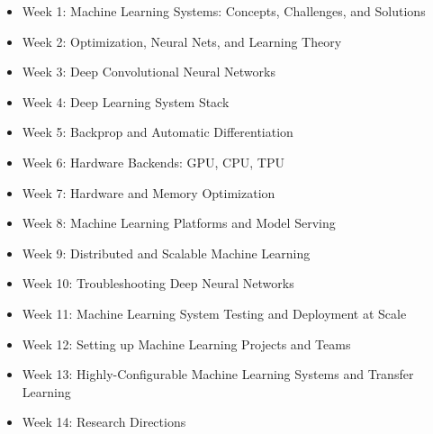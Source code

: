 \documentclass[11pt]{article}
\begin{document}
\begin{itemize}
\item Week 1: Machine Learning Systems: Concepts, Challenges, and Solutions
\item Week 2: Optimization, Neural Nets, and Learning Theory
\item Week 3: Deep Convolutional Neural Networks
\item Week 4: Deep Learning System Stack
\item Week 5: Backprop and Automatic Differentiation
\item Week 6: Hardware Backends: GPU, CPU, TPU
\item Week 7: Hardware and Memory Optimization
\item Week 8: Machine Learning Platforms and Model Serving
\item Week 9: Distributed and Scalable Machine Learning
\item Week 10: Troubleshooting Deep Neural Networks
\item Week 11: Machine Learning System Testing and Deployment at Scale 
\item Week 12: Setting up Machine Learning Projects and Teams 
\item Week 13: Highly-Configurable Machine Learning Systems and Transfer Learning
\item Week 14: Research Directions
\end{itemize}
\end{document}
